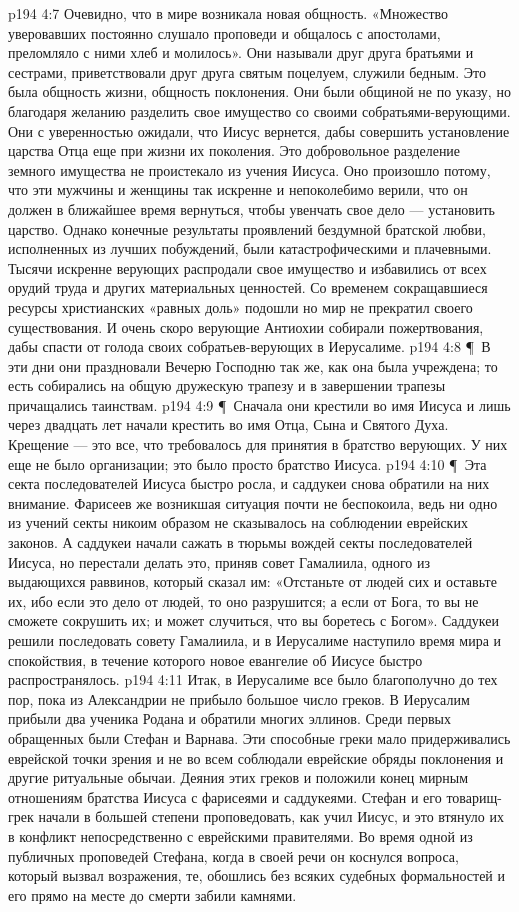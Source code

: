 \vs p194 4:7 Очевидно, что в мире возникала новая общность. «Множество уверовавших постоянно слушало проповеди и общалось с апостолами, преломляло с ними хлеб и молилось». Они называли друг друга братьями и сестрами, приветствовали друг друга святым поцелуем, служили бедным. Это была общность жизни, общность поклонения. Они были общиной не по указу, но благодаря желанию разделить свое имущество со своими собратьями\hyp{}верующими. Они с уверенностью ожидали, что Иисус вернется, дабы совершить установление царства Отца еще при жизни их поколения. Это добровольное разделение земного имущества не проистекало из учения Иисуса. Оно произошло потому, что эти мужчины и женщины так искренне и непоколебимо верили, что он должен в ближайшее время вернуться, чтобы увенчать свое дело --- установить царство. Однако конечные результаты проявлений бездумной братской любви, исполненных из лучших побуждений, были катастрофическими и плачевными. Тысячи искренне верующих распродали свое имущество и избавились от всех орудий труда и других материальных ценностей. Со временем сокращавшиеся ресурсы христианских «равных доль» подошли  но мир не прекратил своего существования. И очень скоро верующие Антиохии собирали пожертвования, дабы спасти от голода своих собратьев\hyp{}верующих в Иерусалиме.
\vs p194 4:8 \P\ В эти дни они праздновали Вечерю Господню так же, как она была учреждена; то есть собирались на общую дружескую трапезу и в завершении трапезы причащались таинствам.
\vs p194 4:9 \P\ Сначала они крестили во имя Иисуса и лишь через двадцать лет начали крестить во имя Отца, Сына и Святого Духа. Крещение --- это все, что требовалось для принятия в братство верующих. У них еще не было организации; это было просто братство Иисуса.
\vs p194 4:10 \P\ Эта секта последователей Иисуса быстро росла, и саддукеи снова обратили на них внимание. Фарисеев же возникшая ситуация почти не беспокоила, ведь ни одно из учений секты никоим образом не сказывалось на соблюдении еврейских законов. А саддукеи начали сажать в тюрьмы вождей секты последователей Иисуса, но перестали делать это, приняв совет Гамалиила, одного из выдающихся раввинов, который сказал им: «Отстаньте от людей сих и оставьте их, ибо если это дело от людей, то оно разрушится; а если от Бога, то вы не сможете сокрушить их; и может случиться, что вы боретесь с Богом». Саддукеи решили последовать совету Гамалиила, и в Иерусалиме наступило время мира и спокойствия, в течение которого новое евангелие об Иисусе быстро распространялось.
\vs p194 4:11 Итак, в Иерусалиме все было благополучно до тех пор, пока из Александрии не прибыло большое число греков. В Иерусалим прибыли два ученика Родана и обратили многих эллинов. Среди первых обращенных были Стефан и Варнава. Эти способные греки мало придерживались еврейской точки зрения и не во всем соблюдали еврейские обряды поклонения и другие ритуальные обычаи. Деяния этих греков и положили конец мирным отношениям братства Иисуса с фарисеями и саддукеями. Стефан и его товарищ\hyp{}грек начали в большей степени проповедовать, как учил Иисус, и это втянуло их в конфликт непосредственно с еврейскими правителями. Во время одной из публичных проповедей Стефана, когда в своей речи он коснулся вопроса, который вызвал возражения, те, обошлись без всяких судебных формальностей и его прямо на месте до смерти забили камнями.
